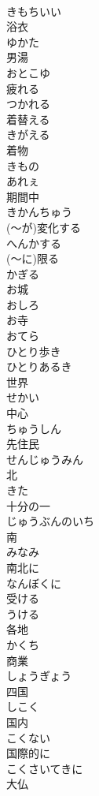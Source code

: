\documentclass[8pt]{extreport}
\begin{document}
\begin{CJK}{UTF8}{min}
\\	きもちいい
\\	浴衣	
\\	ゆかた
\\	男湯	
\\	おとこゆ
\\	疲れる	
\\	つかれる
\\	着替える	
\\	きがえる
\\	着物	
\\	きもの
\\	あれぇ	
\\	期間中	
\\	きかんちゅう
\\	(～が)変化する	
\\	へんかする
\\	(～に)限る	
\\	かぎる
\\	お城	
\\	おしろ
\\	お寺	
\\	おてら
\\	ひとり歩き	
\\	ひとりあるき
\\	世界	
\\	せかい
\\	中心	
\\	ちゅうしん
\\	先住民	
\\	せんじゅうみん
\\	北	
\\	きた
\\	十分の一	
\\	じゅうぶんのいち
\\	南	
\\	みなみ
\\	南北に	
\\	なんぼくに
\\	受ける	
\\	うける
\\	各地	
\\	かくち
\\	商業	
\\	しょうぎょう
\\	四国	
\\	しこく
\\	国内	
\\	こくない
\\	国際的に	
\\	こくさいてきに
\\	大仏	

\end{CJK}
\end{document}
